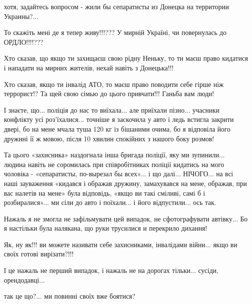 хотя, задайтесь вопросом - жили бы сепаратисты из Донецка на территории Украины?... 

То скажіть мені де я тепер живу!!!??? У мирній Україні, чи повернулась до
ОРДЛО!!!!???

Хто сказав, що якщо ти захищаєш свою рідну Неньку, то ти маєш право кидатися і
нападати на мирних жителів, нехай навіть з Донецька!!! 

Хто сказав, якщо ти інвалід АТО, то маєш право поводити себе гірше ніж
террорист!? Та щей свою сімью до цього привчати!!! Ганьба вам люди! 

І знаєте, що... поліція до нас то виїхала... але приїхали пізно... учасники
конфлікту усі роз’їхалися... точніше я заскочила у авто і ледь встигла закрити
двері, бо на мене мчала туша 120 кг із бішаними очима, бо я відповіла його
дружині її ж мовою, після 10 хвилин спокійних з нашого боку розмов! 

Та цього «захисника» наздогнала інша бригада поліції, яку ми зупинили... людина
навіть не соромилась при співробітниках поліції кидатись на мого чоловіка -
«сепаратисты, по-вырезал бы всех»... і що далі... НІЧОГО... на всі наші
зауваження «кидався і ображав дружину, замахувався на мене, ображав, при вас
налетів на мене» була відповідь, «якщо ви такі сміливі, самі б і
розбиралися»... ми сіли до авто і поїхали... і його відпустили... ось так.

Нажаль я не змогла не зафільмувати цей випадок, не сфотографувати автівку... Бо
я настільки була налякана, що руки трусилися и перекрило дихання!

Як, ну як!!! ви можете називати себе захисниками, інвалідами війни... якщо ви
своїх готові вирізати?!!! 

І це нажаль не перший випадок, і нажаль не на дорогах тільки... сусіди,
орендодавці... 

так це що?... ми повинні своїх вже боятися?

